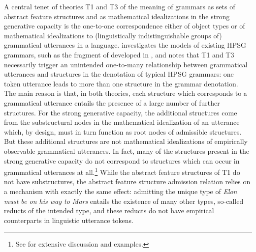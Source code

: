 \documentclass[output=paper,biblatex,babelshorthands,newtxmath,draftmode,colorlinks,citecolor=brown]{langscibook}
\begin{document}
{A central tenet of theories T1 and T3 of the meaning of grammars as
sets of abstract feature structures and as mathematical idealizations
in the strong generative capacity is the one-to-one
correspondence either of object types or of mathematical idealizations
to (linguistically indistinguishable groups of) grammatical utterances
in a language. \citet{Richter2007a}
investigates the models of existing HPSG grammars, such as the fragment
of  developed in , and notes that
T1 and T3 necessarily trigger an unintended one-to-many
relationship between grammatical utterances and structures in the
denotation of typical HPSG grammars: one token utterance leads to more than one
structure in the grammar denotation. The main reason
is that, in both theories, each structure which corresponds
to a grammatical utterance entails the presence of a large
number of further structures. For the strong generative capacity,
the additional structures come from the substructural nodes in the
mathematical idealization of an utterance which, by design, must
in turn function as root nodes of admissible structures. But these additional
structures are not mathematical idealizations of empirically
observable grammatical utterances. In fact, many of the structures
present in the strong generative capacity do not correspond to
structures which can occur in grammatical utterances at all.\footnote{See
   for extensive discussion and 
  examples.} While the abstract feature structures
of T1 do not have substructures, the abstract feature structure admission
relation relies on a mechanism with exactly the same effect: admitting
the unique type of \emph{Elon must be on his way to Mars} entails the existence
of many other types, so-called reducts of the intended
type, and these reducts do not have empirical counterparts in linguistic
utterance tokens.


}
\end{document}
